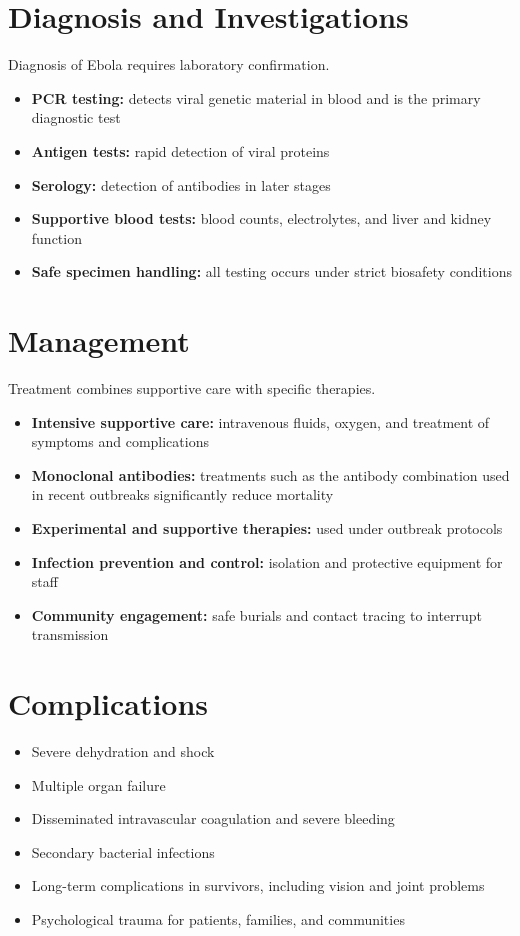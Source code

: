 \section*{Diagnosis and Investigations}
Diagnosis of Ebola requires laboratory confirmation.
\begin{itemize}
    \item \textbf{PCR testing:} detects viral genetic material in blood and is the primary diagnostic test
    \item \textbf{Antigen tests:} rapid detection of viral proteins
    \item \textbf{Serology:} detection of antibodies in later stages
    \item \textbf{Supportive blood tests:} blood counts, electrolytes, and liver and kidney function
    \item \textbf{Safe specimen handling:} all testing occurs under strict biosafety conditions
\end{itemize}

\section*{Management}
Treatment combines supportive care with specific therapies.
\begin{itemize}
    \item \textbf{Intensive supportive care:} intravenous fluids, oxygen, and treatment of symptoms and complications
    \item \textbf{Monoclonal antibodies:} treatments such as the antibody combination used in recent outbreaks significantly reduce mortality
    \item \textbf{Experimental and supportive therapies:} used under outbreak protocols
    \item \textbf{Infection prevention and control:} isolation and protective equipment for staff
    \item \textbf{Community engagement:} safe burials and contact tracing to interrupt transmission
\end{itemize}

\section*{Complications}
\begin{itemize}
    \item Severe dehydration and shock
    \item Multiple organ failure
    \item Disseminated intravascular coagulation and severe bleeding
    \item Secondary bacterial infections
    \item Long-term complications in survivors, including vision and joint problems
    \item Psychological trauma for patients, families, and communities
\end{itemize}

